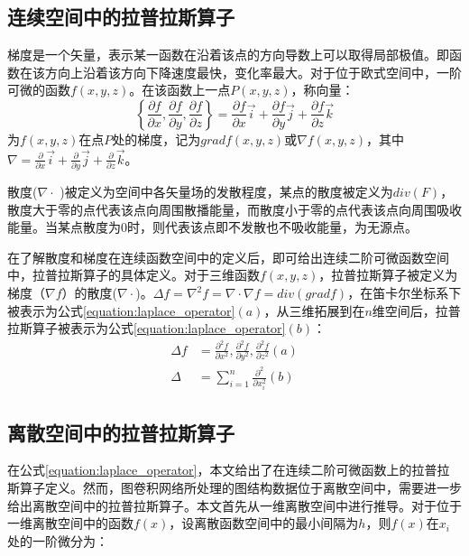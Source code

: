 \subsection{连续空间中的拉普拉斯算子}
梯度是一个矢量，表示某一函数在沿着该点的方向导数上可以取得局部极值。即函数在该方向上沿着该方向下降速度最快，变化率最大。对于位于欧式空间中，一阶可微的函数$f(x,y,z)$。在该函数上一点$P(x,y,z)$，称向量：
\begin{equation}
    \left\{ \frac{\partial f}{\partial x}, \frac{\partial f}{\partial y}, \frac{\partial f}{\partial z} \right\}= \frac{\partial f}{\partial x}\vec{i} + \frac{\partial f}{\partial y}\vec{j} + \frac{\partial f}{\partial z}\vec{k}
    \label{equation:grad}
\end{equation}
为$f(x,y,z)$在点$P$处的梯度，记为$gradf(x,y,z)$或$\nabla f(x,y,z)$，其中$\nabla = \frac{\partial}{\partial x}\vec{i} + \frac{\partial}{\partial y}\vec{j} + \frac{\partial}{\partial z}\vec{k}$。

散度($\nabla \cdot$ )被定义为空间中各矢量场的发散程度，某点的散度被定义为$div(F)$，散度大于零的点代表该点向周围散播能量，而散度小于零的点代表该点向周围吸收能量。当某点散度为0时，则代表该点即不发散也不吸收能量，为无源点。

在了解散度和梯度在连续函数空间中的定义后，即可给出连续二阶可微函数空间中，拉普拉斯算子的具体定义。对于三维函数$f(x,y,z)$，拉普拉斯算子被定义为梯度（$\nabla f$）的散度($\nabla \cdot$)。$\Delta f = \nabla^2 f = \nabla \cdot \nabla f = div(grad f)$，在笛卡尔坐标系下被表示为公式\ref{equation:laplace_operator}$(a)$，从三维拓展到在$n$维空间后，拉普拉斯算子被表示为公式\ref{equation:laplace_operator}$(b)$：
\begin{equation}
    \begin{aligned}
        \Delta f &= \frac{\partial^2 f}{\partial x^2}, \frac{\partial^2 f}{\partial y^2}, \frac{\partial^2 f}{\partial z^2} (a)
        \\
        \Delta &= \sum_{i=1}^{n} \frac{\partial^2}{\partial x^2_i} (b)
   \end{aligned}
    \label{equation:laplace_operator}
\end{equation}

\subsection{离散空间中的拉普拉斯算子}\label{discrate_laplace}
在公式\ref{equation:laplace_operator}，本文给出了在连续二阶可微函数上的拉普拉斯算子定义。然而，图卷积网络所处理的图结构数据位于离散空间中，需要进一步给出离散空间中的拉普拉斯算子。本文首先从一维离散空间中进行推导。对于位于一维离散空间中的函数$f(x)$，设离散函数空间中的最小间隔为$h$，则$f(x)$在$x_i$处的一阶微分为：

